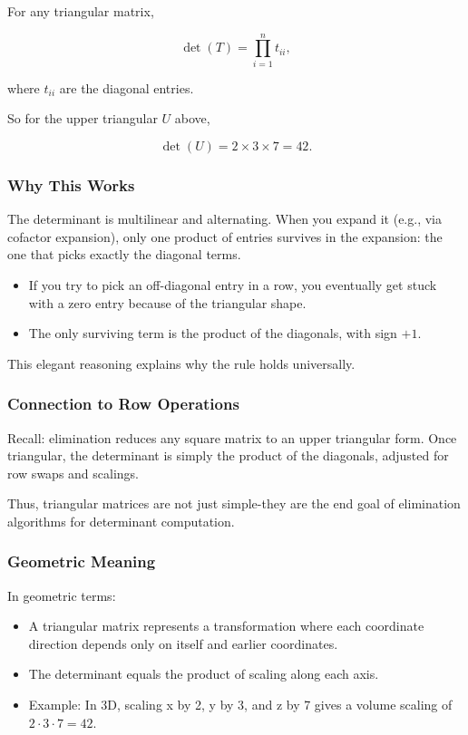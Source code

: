 \documentclass[
  letterpaper,
  DIV=11,
  numbers=noendperiod]{scrreprt}
\providecommand{\tightlist}{%
  \setlength{\itemsep}{0pt}\setlength{\parskip}{0pt}}
\begin{document}
For any triangular matrix,

\[
\det(T) = \prod_{i=1}^n t_{ii},
\]

where \(t_{ii}\) are the diagonal entries.

So for the upper triangular \(U\) above,

\[
\det(U) = 2 \times 3 \times 7 = 42.
\]

\subsubsection{Why This Works}\label{why-this-works}

The determinant is multilinear and alternating. When you expand it
(e.g., via cofactor expansion), only one product of entries survives in
the expansion: the one that picks exactly the diagonal terms.

\begin{itemize}
\tightlist
\item
  If you try to pick an off-diagonal entry in a row, you eventually get
  stuck with a zero entry because of the triangular shape.
\item
  The only surviving term is the product of the diagonals, with sign
  \(+1\).
\end{itemize}

This elegant reasoning explains why the rule holds universally.

\subsubsection{Connection to Row
Operations}\label{connection-to-row-operations}

Recall: elimination reduces any square matrix to an upper triangular
form. Once triangular, the determinant is simply the product of the
diagonals, adjusted for row swaps and scalings.

Thus, triangular matrices are not just simple-they are the end goal of
elimination algorithms for determinant computation.

\subsubsection{Geometric Meaning}\label{geometric-meaning-8}

In geometric terms:

\begin{itemize}
\tightlist
\item
  A triangular matrix represents a transformation where each coordinate
  direction depends only on itself and earlier coordinates.
\item
  The determinant equals the product of scaling along each axis.
\item
  Example: In 3D, scaling x by 2, y by 3, and z by 7 gives a volume
  scaling of \(2 \cdot 3 \cdot 7 = 42\).
\end{itemize}
\end{document}
